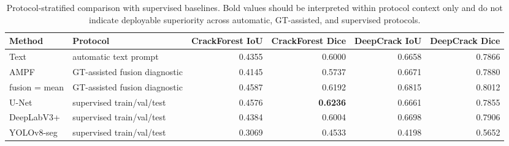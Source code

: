 \begin{table}[ht]
\centering
\caption{Protocol-stratified comparison with supervised baselines. Bold values should be interpreted within protocol context only and do not indicate deployable superiority across automatic, GT-assisted, and supervised protocols.}
\begin{tabular}{llrrrr}
\toprule
Method & Protocol & CrackForest IoU & CrackForest Dice & DeepCrack IoU & DeepCrack Dice \\
\midrule
Text & automatic text prompt & 0.4355 & 0.6000 & 0.6658 & 0.7866 \\
AMPF & GT-assisted fusion diagnostic & 0.4145 & 0.5737 & 0.6671 & 0.7880 \\
fusion = mean & GT-assisted fusion diagnostic & 0.4587 & 0.6192 & 0.6815 & 0.8012 \\
U-Net & supervised train/val/test & 0.4576 & \textbf{0.6236} & 0.6661 & 0.7855 \\
DeepLabV3+ & supervised train/val/test & 0.4384 & 0.6004 & 0.6698 & 0.7906 \\
YOLOv8-seg & supervised train/val/test & 0.3069 & 0.4533 & 0.4198 & 0.5652 \\
\bottomrule
\end{tabular}
\end{table}

